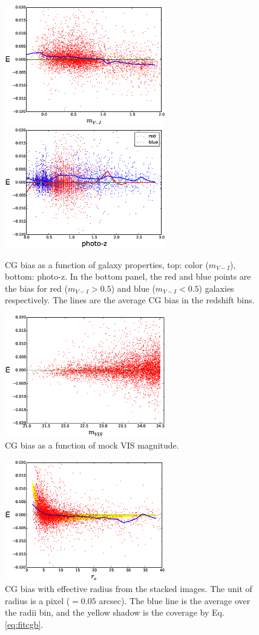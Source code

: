\documentclass[useAMS,usenatbib]{mn2e}
\begin{document}
%
\begin{figure}
\includegraphics[width=7.0cm]{zcolor16.eps}
\includegraphics[width=7.0cm]{zphotoz16.eps}
\caption{CG bias as a function of galaxy properties, top: color
  ($m_{V-I}$), bottom: photo-z. In the bottom panel, the red and blue
  points are the bias for red ($m_{V-I}>0.5$) and blue ($m_{V-I}<0.5$)
  galaxies respectively. The lines are the average CG bias in the
  redshift bins.}
\label{fig:cg2color}
\end{figure}
%
\begin{figure}
\includegraphics[width=7.0cm]{zcgb-magt16.eps}
\caption{CG bias as a function of mock VIS magnitude. }
\label{fig:cg2magvis}
\end{figure}
%
\begin{figure}
\includegraphics[width=7.0cm]{zcgb-ret16.eps}
\caption{CG bias with effective radius from the stacked images. The
  unit of radius is a pixel ($=0.05$ arcsec). The blue line is the
  average over the radii bin, and the yellow shadow is the coverage
  by Eq.\ref{eq:fitcgb}.}
\label{fig:cg2re}
\end{figure}
\end{document}
